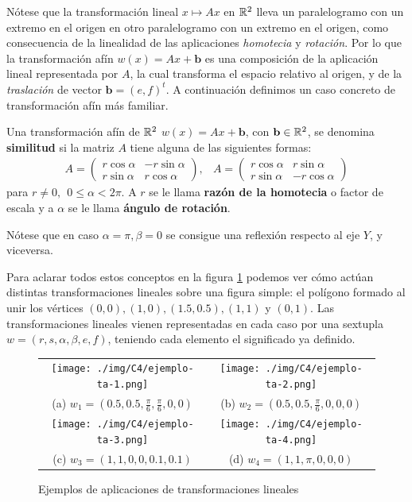Nótese que la transformación lineal $x\mapsto Ax$ en $\mathbb{R}^2$ lleva un paralelogramo con un extremo en el origen en otro paralelogramo con un extremo en el origen, como consecuencia de la linealidad de las aplicaciones \textit{homotecia} y \textit{rotación}. Por lo que la transformación afín $w(x)=Ax+\mathbf b$ es una composición de la aplicación lineal representada por $A$, la cual transforma el espacio relativo al origen, y de la \textit{traslación} de vector $\mathbf b=(e,f)^t$. A continuación definimos un caso concreto de transformación afín más familiar.

\begin{definicion}
    Una transformación afín de $\mathbb{R}^2$ $w(x)=Ax+\mathbf b$, con $\mathbf b\in\mathbb{R}^2$, se denomina \textbf{similitud} si la matriz $A$ tiene alguna de las siguientes formas:
    \begin{eqnarray}
        A = \begin{pmatrix}
            r\cos\alpha & -r\sin\alpha \\
            r\sin\alpha & r\cos\alpha
        \end{pmatrix}
        , &
        A = \begin{pmatrix}
            r\cos\alpha & r\sin\alpha \\
            r\sin\alpha & -r\cos\alpha
        \end{pmatrix}
    \end{eqnarray}
    para $r\not= 0,\ \ 0\leq\alpha<2\pi$. A $r$ se le llama \textbf{razón de la homotecia} o factor de escala y a $\alpha$ se le llama \textbf{ángulo de rotación}.
\end{definicion}

Nótese que en caso $\alpha=\pi,\beta=0$ se consigue una reflexión respecto al eje $Y$, y viceversa.

Para aclarar todos estos conceptos en la figura \ref{fig:ejemplos-ta} podemos ver cómo actúan distintas transformaciones lineales sobre una figura simple: el polígono formado al unir los vértices $(0,0), (1,0), (1.5, 0.5), (1,1)$ y $(0,1)$. Las transformaciones lineales vienen representadas en cada caso por una sextupla $w=(r,s,\alpha,\beta,e,f)$, teniendo cada elemento el significado ya definido.

\begin{figure}[ht]
    \centering
    \begin{tabular}{cc}
      \texttt{[image: ./img/C4/ejemplo-ta-1.png]} &   \texttt{[image: ./img/C4/ejemplo-ta-2.png]} \\
    (a) $w_1=(0.5, 0.5, \frac{\pi}{6}, \frac{\pi}{6}, 0,0)$ & (b) $w_2=(0.5, 0.5, \frac{\pi}{6}, 0,0,0)$ \\[6pt]
    \texttt{[image: ./img/C4/ejemplo-ta-3.png]} &   \texttt{[image: ./img/C4/ejemplo-ta-4.png]} \\
    (c) $w_3=(1,1,0,0,0.1,0.1)$ & (d) $w_4=(1,1,\pi,0,0,0)$ \\[6pt]
    \end{tabular}
    \caption{Ejemplos de aplicaciones de transformaciones lineales}
    \label{fig:ejemplos-ta}
  \end{figure}

